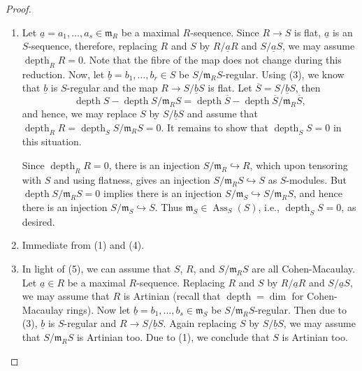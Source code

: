\documentclass[10pt]{article}
\theoremstyle{thmstyle}
\theoremstyle{defstyle}
\newcommand{\Tor}{\operatorname{Tor}}
\newcommand{\frakm}{\mathfrak{m}} %
\newcommand{\frakp}{\mathfrak{p}} %
\newcommand{\into}{\hookrightarrow}
\newcommand{\Ass}{\operatorname{Ass}}
\newcommand{\depth}{\operatorname{depth}}
\newcommand{\ul}[1]{\underline{#1}}
\begin{document}
\begin{proof}
\begin{enumerate}[label=(\arabic*)]
    Consider the short exact sequence 
    \begin{equation*}
        0\to S\xrightarrow{\cdot a} S\to S/aS\to 0,
    \end{equation*}
    and applying $-\otimes_R R/\frakp$, we obtain 
    \begin{equation*}
        0 = \Tor^R_1(S, R/\frakp)\to\Tor^R_1(S/aS, R/\frakp)\to\overline S\xrightarrow{\cdot a}\overline S\to S/aS\otimes_R R/\frakp\to 0.
    \end{equation*}
    Thus $\Tor^R_1(S/aS, R/\frakp) = 0$, as desired. This completes the proof of (3).

    \item Let $\ul a = a_1,\dots,a_s\in\frakm_R$ be a maximal $R$-sequence. Since $R\to S$ is flat, $\ul a$ is an $S$-sequence, therefore, replacing $R$ and $S$ by $R/\ul aR$ and $S/\ul aS$, we may assume $\depth_R R = 0$. Note that the fibre of the map does not change during this reduction. Now, let $\ul b = b_1,\dots, b_r\in S$ be $S/\frakm_R S$-regular. Using (3), we know that $\ul b$ is $S$-regular and the map $R\to S/\ul b S$ is flat. Let $\overline S = S/\ul b S$, then 
    \begin{equation*}
        \depth S - \depth S/\frakm_R S = \depth\overline S - \depth\overline S/\frakm_R\overline S,
    \end{equation*}
    and hence, we may replace $S$ by $S/\ul bS$ and assume that $\depth_R R = \depth_S S/\frakm_R S = 0$. It remains to show that $\depth_S S = 0$ in this situation.

    Since $\depth_R R = 0$, there is an injection $S/\frakm_R \into R$, which upon tensoring with $S$ and using flatness, gives an injection $S/\frakm_R S\into S$ as $S$-modules. But $\depth S/\frakm_R S = 0$ implies there is an injection $S/\frakm_S\into S/\frakm_R S$, and hence there is an injection $S/\frakm_S\into S$. Thus $\frakm_S\in\Ass_S(S)$, i.e., $\depth_S S = 0$, as desired.

    \item Immediate from (1) and (4).

    \item In light of (5), we can assume that $S$, $R$, and $S/\frakm_R S$ are all Cohen-Macaulay. Let $\ul a\in R$ be a maximal $R$-sequence. Replacing $R$ and $S$ by $R/\ul aR$ and $S/\ul aS$, we may assume that $R$ is Artinian (recall that $\depth = \dim$ for Cohen-Macaulay rings). Now let $\ul b = b_1,\dots,b_s\in\frakm_S$ be $S/\frakm_R S$-regular. Then due to (3), $\ul b$ is $S$-regular and $R\to S/\ul bS$. Again replacing $S$ by $S/\ul bS$, we may assume that $S/\frakm_R S$ is Artinian too. Due to (1), we conclude that $S$ is Artinian too.


\end{enumerate}
\end{proof}
\end{document}
